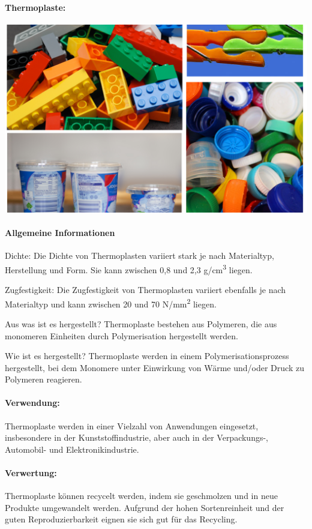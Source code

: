 \documentclass{article}
\begin{document}
\begin{multicols}{3}

\paragraph{Thermoplaste:}
\includegraphics[width=\linewidth]{thermoplast.png}
\paragraph{Allgemeine Informationen}
Dichte: Die Dichte von Thermoplasten variiert stark je nach Materialtyp,
Herstellung und Form. Sie kann zwischen 0,8 und 2,3 g/cm\textsuperscript{3}
liegen.

Zugfestigkeit: Die Zugfestigkeit von Thermoplasten variiert ebenfalls je nach
Materialtyp und kann zwischen 20 und 70 N/mm\textsuperscript{2} liegen.

Aus was ist es hergestellt? Thermoplaste bestehen aus Polymeren, die aus
monomeren Einheiten durch Polymerisation hergestellt werden.

Wie ist es hergestellt? Thermoplaste werden in einem Polymerisationsprozess
hergestellt, bei dem Monomere unter Einwirkung von Wärme und/oder Druck zu
Polymeren reagieren.

\paragraph{Verwendung:}
Thermoplaste werden in einer Vielzahl von Anwendungen eingesetzt, insbesondere
in der Kunststoffindustrie, aber auch in der Verpackungs-, Automobil- und
Elektronikindustrie.

\paragraph{Verwertung:}
Thermoplaste können recycelt werden, indem sie geschmolzen und in neue Produkte
umgewandelt werden. Aufgrund der hohen Sortenreinheit und der guten
Reproduzierbarkeit eignen sie sich gut für das Recycling.


\end{multicols}
\end{document}
